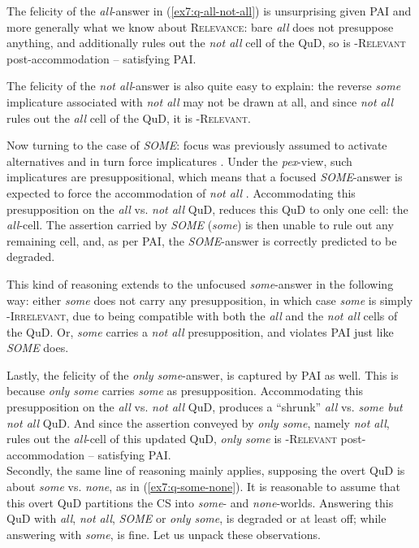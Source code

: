 The felicity of the \textit{all}-answer in (\ref{ex7:q-all-not-all}) is unsurprising given PAI and more generally what we know about \textsc{Relevance}: bare \textit{all} does not presuppose anything, and additionally rules out the \textit{not all} cell of the QuD, so is \textsc{\citeauthor{Roberts2012}-Relevant} post-accommodation -- satisfying PAI.

The felicity of the \textit{not all}-answer is also quite easy to explain: the reverse \textit{some} implicature associated with \textit{not all} may not be drawn at all, and since \textit{not all} rules out the \textit{all} cell of the QuD, it is \textsc{\citeauthor{Roberts2012}-Relevant}.

Now turning to the case of \textit{SOME}: focus was previously assumed to activate alternatives and in turn force implicatures \parencite{Rooth1992,Chierchia2011}. Under the \textit{pex}-view, such implicatures are presuppositional, which means that a focused \textit{SOME}-answer is expected to force the accommodation of \textit{not all} \parencite{Bassi2021}. Accommodating this presupposition on the \textit{all} vs. \textit{not all} QuD, reduces this QuD to only one cell: the \textit{all}-cell. The assertion carried by \textit{SOME} (\textit{some}) is then unable to rule out any remaining cell, and, as per PAI, the \textit{SOME}-answer is correctly predicted to be degraded. 

This kind of reasoning extends to the unfocused \textit{some}-answer in the following way: either \textit{some} does not carry any presupposition, in which case \textit{some} is simply \textsc{\citeauthor{Roberts2012}-Irrelevant}, due to being compatible with both the \textit{all} and the \textit{not all} cells of the QuD. Or, \textit{some} carries a \textit{not all} presupposition, and violates PAI just like \textit{SOME} does. 

Lastly, the felicity of the \textit{only some}-answer, is captured by PAI as well. This is because \textit{only some} carries \textit{some} as presupposition. Accommodating this presupposition on the \textit{all} vs. \textit{not all} QuD, produces a ``shrunk'' \textit{all} vs. \textit{some but not all} QuD. And since the assertion conveyed by \textit{only some}, namely \textit{not all}, rules out the \textit{all}-cell of this updated QuD, \textit{only some} is \textsc{\citeauthor{Roberts2012}-Relevant} post-accommodation -- satisfying PAI.\\


Secondly, the same line of reasoning mainly applies, supposing the overt QuD is about \textit{some} vs. \textit{none}, as in (\ref{ex7:q-some-none}). It is reasonable to assume that this overt QuD partitions the CS into \textit{some}- and \textit{none}-worlds. Answering this QuD with \textit{all}, \textit{not all}, \textit{SOME} or \textit{only some}, is degraded or at least off; while answering with \textit{some}, is fine. Let us unpack these observations.

